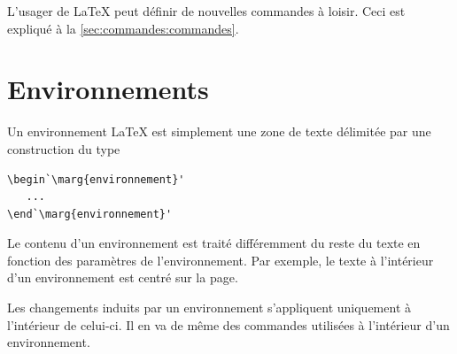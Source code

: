 L'usager de {\LaTeX} peut définir de nouvelles commandes à loisir.
Ceci est expliqué à la \autoref{sec:commandes:commandes}.


\section{Environnements}
\label{sec:bases:environnements}

Un environnement {\LaTeX} est simplement une zone de texte délimitée
par une construction du type
\begin{lstlisting}
\begin`\marg{environnement}'
   ...
\end`\marg{environnement}'
\end{lstlisting}
Le contenu d'un environnement est traité différemment du reste du
texte en fonction des paramètres de l'environnement. Par exemple, le
texte à l'intérieur d'un environnement  est centré sur la
page.

Les changements induits par un environnement s'appliquent uniquement à
l'intérieur de celui-ci. Il en va de même des commandes utilisées à
l'intérieur d'un environnement.

